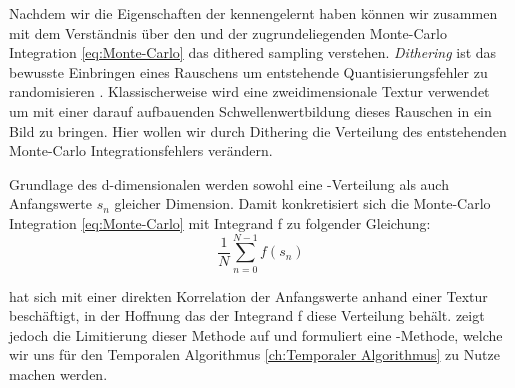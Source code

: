 \label{subsec:dither sampling}
Nachdem wir die Eigenschaften der  kennengelernt haben
können wir zusammen mit dem Verständnis über den  und der 
zugrundeliegenden Monte-Carlo Integration \ref{eq:Monte-Carlo} das dithered sampling verstehen.
\textit{Dithering} ist das bewusste Einbringen eines Rauschens um entstehende Quantisierungsfehler
zu randomisieren \cite{georgiev2016blue}.
Klassischerweise wird eine zweidimensionale 
 Textur verwendet um mit einer darauf aufbauenden Schwellenwertbildung
dieses Rauschen in ein Bild zu bringen. 
Hier wollen wir durch Dithering die Verteilung des 
entstehenden Monte-Carlo Integrationsfehlers verändern.\par
Grundlage des d-dimensionalen  werden sowohl eine 
-Verteilung als auch Anfangswerte $s_{n}$ gleicher Dimension.
Damit konkretisiert sich die Monte-Carlo Integration \ref{eq:Monte-Carlo} mit Integrand f zu folgender 
Gleichung:
\begin{equation}\label{eq:concreteMonteCarlo}
    \frac{1}{N}\sum_{n=0}^{N-1}f(s_{n})
\end{equation}

\cite{georgiev2016blue} hat sich mit einer direkten Korrelation der Anfangswerte anhand einer 
 Textur beschäftigt, in der Hoffnung das der Integrand f diese
Verteilung behält. \cite{hal02158423} zeigt jedoch die Limitierung dieser Methode auf und 
formuliert eine -Methode, welche wir uns für den 
Temporalen Algorithmus \ref{ch:Temporaler Algorithmus} zu Nutze machen werden.



